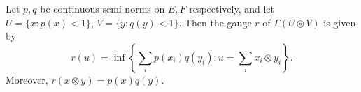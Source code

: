 Let $p, q$ be continuous semi-norms on $E, F$ respectively, and let $U = \{x: p(x) < 1\}$, $V = \{y: q(y) < 1\}$. Then the gauge $r$ of $\Gamma(U \otimes V)$ is given by $$r(u) = \inf \left\{ \sum_i p(x_i)q(y_i) : u = \sum_i x_i \otimes y_i \right\}.$$ Moreover, $r(x \otimes y) = p(x)q(y)$.

